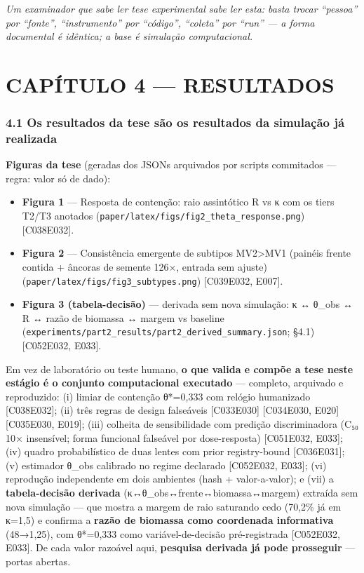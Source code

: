 \documentclass[
  10pt,
]{article}
\providecommand{\tightlist}{%
  \setlength{\itemsep}{0pt}\setlength{\parskip}{0pt}}
\begin{document}
\emph{Um examinador que sabe ler tese experimental sabe ler esta: basta
trocar ``pessoa'' por ``fonte'', ``instrumento'' por ``código'',
``coleta'' por ``run'' --- a forma documental é idêntica; a base é
simulação computacional.}

\hypertarget{capuxedtulo-4-resultados}{%
\section{CAPÍTULO 4 --- RESULTADOS}\label{capuxedtulo-4-resultados}}

\hypertarget{os-resultados-da-tese-suxe3o-os-resultados-da-simulauxe7uxe3o-juxe1-realizada}{%
\subsubsection{4.1 Os resultados da tese são os resultados da simulação
já
realizada}\label{os-resultados-da-tese-suxe3o-os-resultados-da-simulauxe7uxe3o-juxe1-realizada}}

\textbf{Figuras da tese} (geradas dos JSONs arquivados por scripts
commitados --- regra: valor só de dado):

\begin{itemize}
\tightlist
\item
  \textbf{Figura 1} --- Resposta de contenção: raio assintótico R vs κ
  com os tiers T2/T3 anotados
  (\texttt{paper/latex/figs/fig2\_theta\_response.png})
  {[}C038\textbar E032{]}.
\item
  \textbf{Figura 2} --- Consistência emergente de subtipos
  MV2\textgreater MV1 (painéis frente contida + âncoras de semente 126×,
  entrada sem ajuste) (\texttt{paper/latex/figs/fig3\_subtypes.png})
  {[}C039\textbar E032, E007{]}.
\item
  \textbf{Figura 3 (tabela-decisão)} --- derivada sem nova simulação: κ
  ↔ θ\_obs ↔ R ↔ razão de biomassa ↔ margem vs baseline
  (\texttt{experiments/part2\_results/part2\_derived\_summary.json};
  §4.1) {[}C052\textbar E032, E033{]}.
\end{itemize}

Em vez de laboratório ou teste humano, \textbf{o que valida e compõe a
tese neste estágio é o conjunto computacional executado} --- completo,
arquivado e reproduzido: (i) limiar de contenção θ*=0,333 com relógio
humanizado {[}C038\textbar E032{]}; (ii) três regras de design
falseáveis {[}C033\textbar E030{]} {[}C034\textbar E030, E020{]}
{[}C035\textbar E030, E019{]}; (iii) colheita de sensibilidade com
predição discriminadora (C₅₀ 10× insensível; forma funcional falseável
por dose-resposta) {[}C051\textbar E032, E033{]}; (iv) quadro
probabilístico de duas lentes com prior registry-bound
{[}C036\textbar E031{]}; (v) estimador θ\_obs calibrado no regime
declarado {[}C052\textbar E032, E033{]}; (vi) reprodução independente em
dois ambientes (hash + valor-a-valor); e (vii) a \textbf{tabela-decisão
derivada} (κ↔θ\_obs↔frente↔biomassa↔margem) extraída sem nova simulação
--- que mostra a margem de raio saturando cedo (70,2\% já em κ=1,5) e
confirma a \textbf{razão de biomassa como coordenada informativa}
(48→1,25), com θ*=0,333 como variável-de-decisão pré-registrada
{[}C052\textbar E032, E033{]}. De cada valor razoável aqui,
\textbf{pesquisa derivada já pode prosseguir} --- portas abertas.
\end{document}
